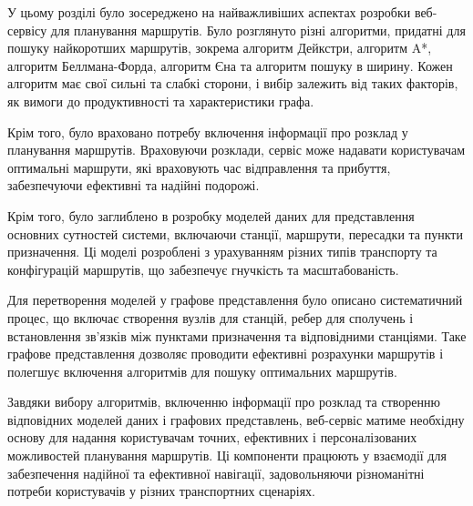
У цьому розділі було зосереджено на найважливіших аспектах розробки веб-сервісу для планування маршрутів. Було розглянуто різні алгоритми, придатні для пошуку найкоротших маршрутів, зокрема алгоритм Дейкстри, алгоритм A*, алгоритм Беллмана-Форда, алгоритм Єна та алгоритм пошуку в ширину. Кожен алгоритм має свої сильні та слабкі сторони, і вибір залежить від таких факторів, як вимоги до продуктивності та характеристики графа.

Крім того, було враховано потребу включення інформації про розклад у планування маршрутів. Враховуючи розклади, сервіс може надавати користувачам оптимальні маршрути, які враховують час відправлення та прибуття, забезпечуючи ефективні та надійні подорожі.

Крім того, було заглиблено в розробку моделей даних для представлення основних сутностей системи, включаючи станції, маршрути, пересадки та пункти призначення. Ці моделі розроблені з урахуванням різних типів транспорту та конфігурацій маршрутів, що забезпечує гнучкість та масштабованість.

Для перетворення моделей у графове представлення було описано систематичний процес, що включає створення вузлів для станцій, ребер для сполучень і встановлення зв'язків між пунктами призначення та відповідними станціями. Таке графове представлення дозволяє проводити ефективні розрахунки маршрутів і полегшує включення алгоритмів для пошуку оптимальних маршрутів.

Завдяки вибору алгоритмів, включенню інформації про розклад та створенню відповідних моделей даних і графових представлень, веб-сервіс матиме необхідну основу для надання користувачам точних, ефективних і персоналізованих можливостей планування маршрутів. Ці компоненти працюють у взаємодії для забезпечення надійної та ефективної навігації, задовольняючи різноманітні потреби користувачів у різних транспортних сценаріях.